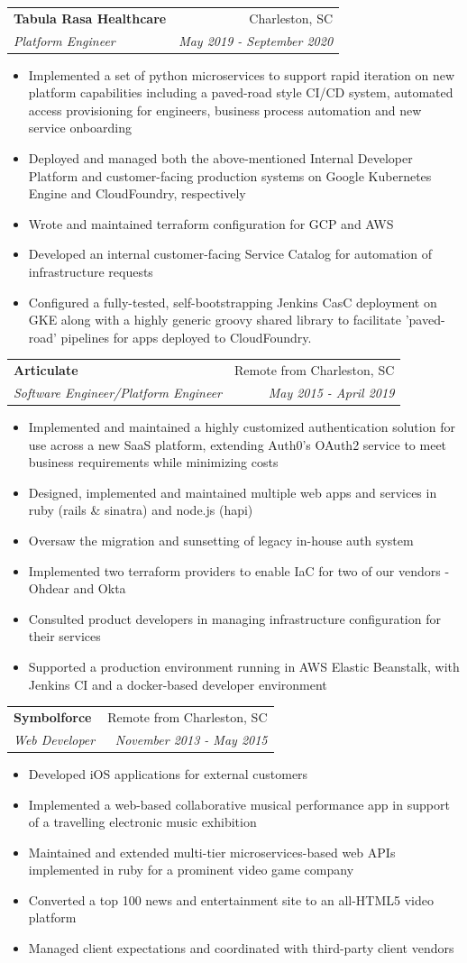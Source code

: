 \documentclass[letterpaper,11pt]{article}
\makeatletter
\newcommand{\resumeItem}[2]{
  \item\small{
    \textbf{#1}{ #2 \vspace{-2pt}}
  }
}
\newcommand{\resumeSubheading}[4]{
  \vspace{-1pt}\item
    \begin{tabular*}{0.97\textwidth}{l@{\extracolsep{\fill}}r}
      \textbf{#1} & #2 \\
      \textit{\small#3} & \textit{\small #4} \\
    \end{tabular*}\vspace{-5pt}
}
\newcommand{\resumeItemListStart}{\begin{itemize}}
\newcommand{\resumeItemListEnd}{\end{itemize}\vspace{-5pt}}
\makeatother
\begin{document}
  \resumeSubheading
      {Tabula Rasa Healthcare}{Charleston, SC}
      {Platform Engineer}{May 2019 - September 2020}
      \resumeItemListStart
        \resumeItem{}
          { Implemented a set of python microservices to support rapid iteration on new platform capabilities including a paved-road style CI/CD system, automated access provisioning for engineers, business process automation and new service onboarding}
        \resumeItem{}
          { Deployed and managed both the above-mentioned Internal Developer Platform and customer-facing production systems on Google Kubernetes Engine and CloudFoundry, respectively}
        \resumeItem{}
          { Wrote and maintained terraform configuration for GCP and AWS}
        \resumeItem{}
          { Developed an internal customer-facing Service Catalog for automation of infrastructure requests}
        \resumeItem{}
          { Configured a fully-tested, self-bootstrapping Jenkins CasC deployment on GKE along with a highly generic groovy shared library to facilitate 'paved-road' pipelines for apps deployed to CloudFoundry.}
      \resumeItemListEnd

    \resumeSubheading
      {Articulate}{Remote from Charleston, SC}
      {Software Engineer/Platform Engineer}{May 2015 - April 2019}
      \resumeItemListStart
        \resumeItem{}
          { Implemented and maintained a highly customized authentication solution for use across a new SaaS platform, extending Auth0's OAuth2 service to meet business requirements while minimizing costs}
        \resumeItem{}
          { Designed, implemented and maintained multiple web apps and services in ruby (rails \& sinatra) and node.js (hapi)}
        \resumeItem{}
          { Oversaw the migration and sunsetting of legacy in-house auth system}
        \resumeItem{}
          { Implemented two terraform providers to enable IaC for two of our vendors - Ohdear and Okta}
        \resumeItem{}
          { Consulted product developers in managing infrastructure configuration for their services}
        \resumeItem{}
          { Supported a production environment running in AWS Elastic Beanstalk, with Jenkins CI and a docker-based developer environment }
      \resumeItemListEnd

    \resumeSubheading
      {Symbolforce}{Remote from Charleston, SC}
      {Web Developer}{November 2013 - May 2015}
      \resumeItemListStart
        \resumeItem{}
          {Developed iOS applications for external customers}
        \resumeItem{}
          { Implemented a web-based collaborative musical performance app in support of a travelling electronic music exhibition}
        \resumeItem{}
          { Maintained and extended multi-tier microservices-based web APIs implemented in ruby for a prominent video game company}
        \resumeItem{}
          { Converted a top 100 news and entertainment site to an all-HTML5 video platform}
        \resumeItem{}
          { Managed client expectations and coordinated with third-party client vendors}
      \resumeItemListEnd
\end{document}
